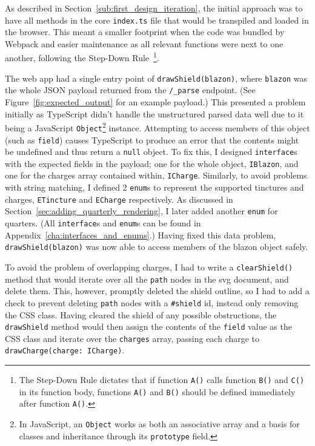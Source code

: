 \documentclass[nobib, a4paper, twoside, justified]{tufte-book}
\makeatletter
\newcommand{\svg}{\gls{svg}\@\xspace}
\newcommand{\charge}{\gls{charge}\@\xspace}
\newcommand{\charges}{\glspl{charge}\@\xspace}
\newcommand{\blazon}{\gls{blazon}\@\xspace}
\newcommand{\payload}{\gls{payload}\@\xspace}
\makeatother
\begin{document}
As described in Section~\ref{sub:first_design_iteration}, the initial approach was to have all methods in
the core \texttt{index.ts} file that would be \gls{transpile}d and loaded in the browser. This
meant a smaller footprint when the code was bundled by Webpack and easier maintenance as all
relevant functions were next to one another, following the Step-Down
Rule~\autocite{martin2009clean}\footnote{The Step-Down Rule dictates that if function \texttt{A()}
calls function \texttt{B()} and \texttt{C()} in its function body, functions \texttt{A()} and
\texttt{B()} should be defined immediately after function \texttt{A()}.}.

The web app had a single entry point of \texttt{drawShield(\blazon)}, where \texttt{\blazon} was the
whole JSON \payload returned from the \texttt{/\_parse} endpoint. (See
Figure~\ref{fig:expected_output} for an example \payload.) This presented a problem initially as
TypeScript didn't handle the unstructured parsed data well due to it being a JavaScript
\texttt{Object}\footnote{In JavaScript, an \texttt{Object} works as both an associative array and a
basis for classes and inheritance through its \texttt{prototype} field.} instance. Attempting to
access members of this object (such as \texttt{\gls{field}}) causes TypeScript to produce an error
that the contents might be undefined and thus return a \texttt{null} object. To fix this, I
designed \texttt{interface}s with the expected fields in the \payload; one for the whole object,
\texttt{IBlazon}, and one for the \charges{} array contained within, \texttt{ICharge}. Similarly,
to avoid problems with string matching, I defined 2 \texttt{enum}s to represent the supported
tinctures and \charges{}, \texttt{ETincture} and \texttt{ECharge} respectively. As discussed in
Section~\ref{sec:adding_quarterly_rendering}, I later added another \texttt{enum} for quarters.
(All \texttt{interface}s and \texttt{enum}s can be found in
Appendix~\ref{cha:interfaces_and_enums}.) Having fixed this data problem,
\texttt{drawShield(\blazon)} was now able to access members of the \blazon object safely.

To avoid the problem of overlapping \charges{}, I had to write a \texttt{clearShield()} method that
would iterate over all the \texttt{path} nodes in the \svg{} document, and delete them. This,
however, promptly deleted the shield outline, so I had to add a check to prevent deleting
\texttt{path} nodes with a \texttt{\#shield} id, instead only removing the CSS class. Having
cleared the shield of any possible obstructions, the \texttt{drawShield} method would then assign
the contents of the \texttt{field} value as the CSS class and iterate over the \texttt{\charges{}}
array, passing each \charge{} to \texttt{drawCharge(charge:~ICharge)}.
\end{document}
